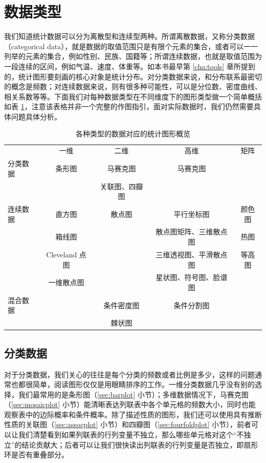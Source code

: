 \documentclass[
  b5paper,
  UTF8,twoside]{book}
\begin{document}
\section{数据类型}\label{sec:data-type}

我们知道统计数据可以分为离散型和连续型两种。所谓离散数据，又称分类数据（categorical data），就是数据的取值范围只是有限个元素的集合，或者可以一一列举的元素的集合，例如性别、民族、国籍等；所谓连续数据，也就是取值范围为一段连续的区间，例如气温、速度、体重等。如本书最早第 \ref{cha:tools} 章所提到的，统计图形要刻画的核心对象是统计分布。对分类数据来说，和分布联系最密切的概念是频数；对连续数据来说，则有很多种可能性，可以是分位数、密度曲线、相关系数等等。下面我们对每种数据类型在不同维度下的图形类型做一个简单概括如表 \ref{tab:plot-summary}，注意该表格并非一个完整的作图指引，面对实际数据时，我们仍然需要具体问题具体分析。

\begin{longtable}[]{@{}lcccc@{}}
\caption{\label{tab:plot-summary} 各种类型的数据对应的统计图形概览}\tabularnewline
\toprule\noalign{}
\endfirsthead
\endhead
\bottomrule\noalign{}
\endlastfoot
& 一维 & 二维 & 高维 & 矩阵 \\
分类数据 & 条形图 & 马赛克图 & 马赛克图 & \\
& & 关联图、四瓣图 & & \\
连续数据 & 直方图 & 散点图 & 平行坐标图 & 颜色图 \\
& 箱线图 & & 散点图矩阵、三维散点图 & 热图 \\
& Cleveland 点图 & & 三维透视图、平滑散点图 & 等高图 \\
& 一维散点图 & & 星状图、符号图、脸谱图 & \\
混合数据 & & 条件密度图 & 条件分割图 & \\
& & 棘状图 & & \\
\end{longtable}

\subsection{分类数据}\label{ux5206ux7c7bux6570ux636e}

对于分类数据，我们关心的往往是每个分类的频数或者比例是多少，这样的问题通常也都很简单，阅读图形仅仅是用眼睛排序的工作。一维分类数据几乎没有别的选择，我们最常用的是条形图（\ref{sec:barplot} 小节）；多维数据情况下，马赛克图（\ref{sec:mosaicplot} 小节）能清晰表达列联表中各个单元格的频数大小，同时也能观察表中的边际概率和条件概率。除了描述性质的图形，我们还可以使用具有推断性质的关联图（\ref{sec:assocplot} 小节）和四瓣图（\ref{sec:fourfoldplot} 小节），前者可以让我们清楚看到如果列联表的行列变量不独立，那么哪些单元格对这个``不独立''的结论贡献大；后者可以让我们很快读出列联表的行列变量是否独立，即扇形环是否有重叠部分。
\end{document}
